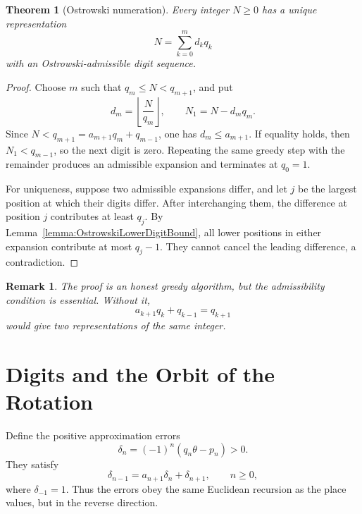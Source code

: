 \documentclass{book}
\newtheorem{remark}[definition]{Remark}
\newtheorem{theorem}[definition]{Theorem}
\begin{document}
\begin{theorem}[Ostrowski numeration]
  \label{theorem:OstrowskiNumeration}
  Every integer \(N\geq0\) has a unique representation
  \begin{equation}\label{eq:OstrowskiExpansion}
    N=\sum_{k=0}^{m}d_kq_k
  \end{equation}
  with an Ostrowski-admissible digit sequence.
\end{theorem}
\begin{proof}
  Choose \(m\) such that \(q_m\leq N<q_{m+1}\), and put
  \[
    d_m=\left\lfloor\frac{N}{q_m}\right\rfloor,
    \qquad N_1=N-d_mq_m.
  \]
  Since \(N<q_{m+1}=a_{m+1}q_m+q_{m-1}\), one has
  \(d_m\leq a_{m+1}\).  If equality holds, then
  \(N_1<q_{m-1}\), so the next digit is zero.  Repeating the same greedy
  step with the remainder produces an admissible expansion and terminates
  at \(q_0=1\).

  For uniqueness, suppose two admissible expansions differ, and let \(j\)
  be the largest position at which their digits differ.  After interchanging
  them, the difference at position \(j\) contributes at least \(q_j\).
  By Lemma~\ref{lemma:OstrowskiLowerDigitBound}, all lower positions in
  either expansion contribute at most \(q_j-1\).  They cannot cancel the
  leading difference, a contradiction.
\end{proof}

\begin{remark}
  The proof is an honest greedy algorithm, but the admissibility condition
  is essential.  Without it,
  \[
    a_{k+1}q_k+q_{k-1}=q_{k+1}
  \]
  would give two representations of the same integer.
\end{remark}

\section{Digits and the Orbit of the Rotation}

Define the positive approximation errors
\begin{equation}\label{eq:PositiveConvergentErrors}
  \delta_n=(-1)^n(q_n\theta-p_n)>0.
\end{equation}
They satisfy
\begin{equation}\label{eq:ErrorRecursion}
  \delta_{n-1}=a_{n+1}\delta_n+\delta_{n+1},
  \qquad n\geq0,
\end{equation}
where \(\delta_{-1}=1\).  Thus the errors obey the same Euclidean recursion
as the place values, but in the reverse direction.
\end{document}
